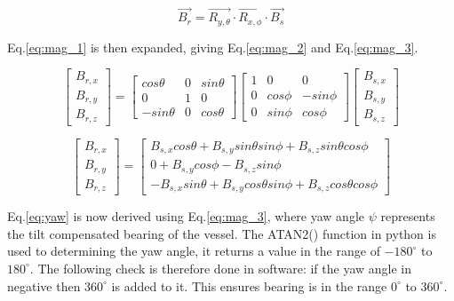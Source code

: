 \begin{equation}
    \label{eq:mag_1}
    \vec{B_{r}} = \vec{R_{y,\theta}} \cdot \vec{R_{x,\phi}} \cdot \vec{B_{s}}
\end{equation}

Eq.\ref{eq:mag_1} is then expanded, giving Eq.\ref{eq:mag_2} and Eq.\ref{eq:mag_3}.

\begin{equation}
    \label{eq:mag_2}
    \begin{bmatrix} B_{r,x} \\ B_{r,y} \\ B_{r,z} \end{bmatrix} = \begin{bmatrix} cos\theta & 0 & sin\theta \\ 0 & 1 & 0 \\ -sin\theta & 0 & cos\theta \end{bmatrix} \begin{bmatrix} 1 & 0 & 0 \\ 0 & cos\phi & -sin\phi \\ 0 & sin\phi & cos\phi \end{bmatrix} \begin{bmatrix} B_{s,x} \\ B_{s,y} \\ B_{s,z} \end{bmatrix}
\end{equation}

\begin{equation}
    \label{eq:mag_3}
    \begin{bmatrix} B_{r,x} \\ B_{r,y} \\ B_{r,z} \end{bmatrix} = \begin{bmatrix} B_{s,x} cos\theta + B_{s,y} sin\theta sin\phi + B_{s,z} sin\theta cos\phi \\ 0 + B_{s,y} cos\phi - B_{s,z} sin\phi \\ -B_{s,x} sin\theta +  B_{s,y} cos\theta sin\phi + B_{s,z} cos\theta cos\phi \end{bmatrix} 
\end{equation}

Eq.\ref{eq:yaw} is now derived using Eq.\ref{eq:mag_3}, where yaw angle $\psi$ represents the tilt compensated bearing of the vessel. The ATAN2() function in python is used to determining 
the yaw angle, it returns a value in the range of $-180^{\circ}$ to $180^{\circ}$. The following check is therefore done in software: if the yaw angle in negative then $360^{\circ}$ is added
to it. This ensures bearing is in the range $0^{\circ}$ to $360^{\circ}$.

